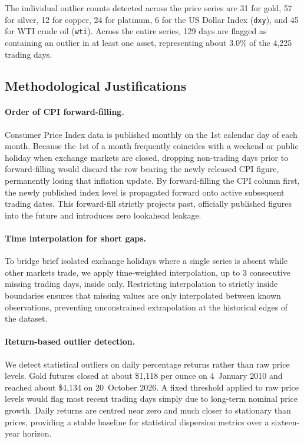 The individual outlier counts detected across the price series are 31 for gold, 57 for silver, 12 for copper, 24 for platinum, 6 for the US Dollar Index (\texttt{dxy}), and 45 for WTI crude oil (\texttt{wti}). Across the entire series, 129 days are flagged as containing an outlier in at least one asset, representing about 3.0\% of the 4,225 trading days.

\subsection{Methodological Justifications}

\paragraph{Order of CPI forward-filling.}
Consumer Price Index data is published monthly on the 1st calendar day of each month. Because the 1st of a month frequently coincides with a weekend or public holiday when exchange markets are closed, dropping non-trading days prior to forward-filling would discard the row bearing the newly released CPI figure, permanently losing that inflation update. By forward-filling the CPI column first, the newly published index level is propagated forward onto active subsequent trading dates. This forward-fill strictly projects past, officially published figures into the future and introduces zero lookahead leakage.

\paragraph{Time interpolation for short gaps.}
To bridge brief isolated exchange holidays where a single series is absent while other markets trade, we apply time-weighted interpolation, up to 3 consecutive missing trading days, inside only. Restricting interpolation to strictly inside boundaries ensures that missing values are only interpolated between known observations, preventing unconstrained extrapolation at the historical edges of the dataset.

\paragraph{Return-based outlier detection.}
We detect statistical outliers on daily percentage returns rather than raw price levels. Gold futures closed at about \$1,118 per ounce on 4~January 2010 and reached about \$4,134 on 20~October 2026. A fixed threshold applied to raw price levels would flag most recent trading days simply due to long-term nominal price growth. Daily returns are centred near zero and much closer to stationary than prices, providing a stable baseline for statistical dispersion metrics over a sixteen-year horizon.

